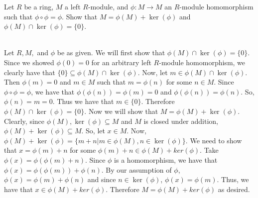 Let $R$ be a ring, $M$ a left $R$-module, and $\phi:M\rightarrow M$ an $R$-module homomorphism such that
$\phi\circ\phi=\phi$. Show that $M=\phi(M)+\ker(\phi)$ and $\phi(M)\cap\ker(\phi)=\{0\}$.

\begin{solution}\renewcommand{\qedsymbol}{}\ \\
    Let $R, M,$ and $\phi$ be as given. We will first show that $\phi(M)\cap\ker(\phi)=\{0\}$. Since we
    showed $\phi(0)=0$ for an arbitrary left $R$-module homomorphism, we clearly have that
    $\{0\}\subseteq\phi(M)\cap\ker(\phi)$. Now, let $m\in\phi(M)\cap\ker(\phi)$. Then $\phi(m)=0$ and
    $m\in M$ such that $m=\phi(n)$ for some $n\in M$. Since $\phi\circ\phi=\phi$, we have that
    $\phi(\phi(n))=\phi(m)=0$ and $\phi(\phi(n))=\phi(n)$. So, $\phi(n)=m=0$. Thus we have that
    $m\in\{0\}$. Therefore $\phi(M)\cap\ker(\phi)=\{0\}$. Now we will show that $M=\phi(M)+\ker(\phi)$.
    Clearly, since $\phi(M),\ker(\phi)\subseteq M$ and $M$ is closed under addition,
    $\phi(M)+\ker(\phi)\subseteq M$. So, let $x\in M$. Now,
    $\phi(M)+\ker(\phi)=\{m+n|m\in\phi(M),n\in\ker(\phi)\}$. We need to show that $x=\phi(m)+n$ for some
    $\phi(m)+n\in\phi(M)+ker(\phi)$. Take $\phi(x)=\phi(\phi(m)+n)$. Since $\phi$ is a homomorphism, we
    have that $\phi(x)=\phi(\phi(m))+\phi(n)$. By our assumption of $\phi$, $\phi(x)=\phi(m)+\phi(n)$
    and since $n\in\ker(\phi)$, $\phi(x)=\phi(m)$. Thus, we have that $x\in\phi(M)+ker(\phi)$. Therefore
    $M=\phi(M)+ker(\phi)$ as desired.

\end{solution}